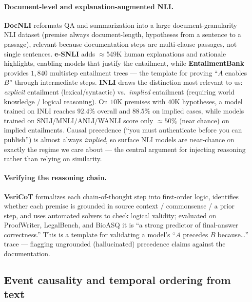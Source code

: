 \paragraph{Document-level and explanation-augmented NLI.}
\textbf{DocNLI} \citep{caus:yin2021docnli} reformats QA and summarization into a
large document-granularity NLI dataset (premise always document-length,
hypotheses from a sentence to a passage), relevant because documentation steps
are multi-clause passages, not single sentences. \textbf{e-SNLI}
\citep{caus:camburu2018esnli} adds $\approx$549K human explanations and rationale
highlights, enabling models that justify the entailment, while
\textbf{EntailmentBank} \citep{caus:dalvi2021entailmentbank} provides $1{,}840$
multistep entailment trees --- the template for proving ``$A$ enables $B$''
through intermediate steps. \textbf{INLI} \citep{caus:havaldar2025inli} draws the
distinction most relevant to us: \emph{explicit} entailment (lexical/syntactic)
vs.\ \emph{implied} entailment (requiring world knowledge / logical reasoning).
On $10$K premises with $40$K hypotheses, a model trained on INLI reaches
$92.4\%$ overall and $88.5\%$ on implied cases, while models trained on
SNLI/MNLI/ANLI/WANLI score only $\approx$$50\%$ (near chance) on implied
entailments. Causal precedence (``you must authenticate before you can
publish'') is almost always \emph{implied}, so surface NLI models are near-chance
on exactly the regime we care about --- the central argument for injecting
reasoning rather than relying on similarity.

\paragraph{Verifying the reasoning chain.}
\textbf{VeriCoT} \citep{caus:feng2025vericot} formalizes each chain-of-thought
step into first-order logic, identifies whether each premise is grounded in
source context / commonsense / a prior step, and uses automated solvers to check
logical validity; evaluated on ProofWriter, LegalBench, and BioASQ it is ``a
strong predictor of final-answer correctness.'' This is a template for validating
a model's ``$A$ precedes $B$ because\ldots'' trace --- flagging ungrounded
(hallucinated) precedence claims against the documentation.

\subsection{Event causality and temporal ordering from text}
\label{sec:event-causality}

